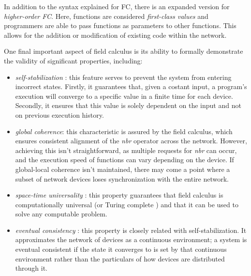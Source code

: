 \documentclass[12pt,a4paper,openright,twoside]{book}
\begin{document}
In addition to the syntax explained for FC, there is an expanded version for \emph{higher-order FC}. 
    Here, functions are considered \emph{first-class values} and programmers are able to pass functions as parameters 
    to other functions. This allows for the addition or modification of existing code within the network.

One final important aspect of field calculus is its ability to formally demonstrate the 
    validity of significant properties, including:
    \begin{itemize}
        \item \emph{self-stabilization} \cite{viroli2018engineering, viroli2014calculus, dolev2000self,lafuente2015fixpoint}:
        this feature serves to prevent the system from entering incorrect states. Firstly, it guarantees that, given a costant input, a program's 
        execution will converge to a specific value in a finite time for each device. Secondly, it ensures that this value is solely 
        dependent on the input and not on previous execution history.
        \item \emph{global coherence}: this characteristic is assured by the field calculus, which ensures consistent alignment of the \emph{nbr}
        operator across the network. However, achieving this isn't straightforward, as multiple requests for \emph{nbr} can occur, 
        and the execution speed of functions can vary depending on the device. 
        If global-local coherence isn't maintained, there may come a point where a subset of network devices loses 
        synchronization with the entire network.
        \item \emph{space-time universality} \cite{audrito2018space}: this property guarantees that field calculus is computationally 
        universal (or Turing complete \cite{turing2009computing, turing1936computable}) and that it can be used to solve any computable problem.
        \item \emph{eventual consistency} \cite{beal2017self}: this property is closely related with self-stabilization. It approximates the network of devices
        as a continuous environment; a system is eventual consistent if the state it converges to is set by that continuous environment rather than 
        the particulars of how devices are distributed through it.
    \end{itemize}
    
\end{document}
